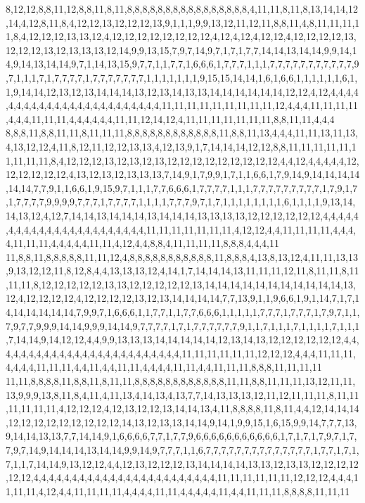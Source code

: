 8,12,12,8,8,11,12,8,8,11,8,11,8,8,8,8,8,8,8,8,8,8,8,8,8,8,8,8,4,11,11,8,11,8,13,14,14,12,14,4,12,8,11,8,4,12,12,13,12,12,12,13,9,1,1,1,9,9,13,12,11,12,11,8,8,11,4,8,11,11,11,11,8,4,12,12,12,13,13,12,4,12,12,12,12,12,12,12,12,4,12,4,12,4,12,12,4,12,12,12,12,13,12,12,12,13,12,13,13,13,12,14,9,9,13,15,7,9,7,14,9,7,1,7,1,7,7,14,14,13,14,14,9,9,14,14,9,14,13,14,14,9,7,1,14,13,15,9,7,7,1,1,7,7,1,6,6,6,1,7,7,7,1,1,1,7,7,7,7,7,7,7,7,7,7,7,9,7,1,1,1,7,1,7,7,7,7,1,7,7,7,7,7,7,7,1,1,1,1,1,1,1,9,15,15,14,14,1,6,1,6,6,1,1,1,1,1,1,6,1,1,9,14,14,12,13,12,13,14,14,14,13,12,13,14,13,13,14,14,14,14,14,14,12,12,4,12,4,4,4,4,4,4,4,4,4,4,4,4,4,4,4,4,4,4,4,4,4,4,4,4,11,11,11,11,11,11,11,11,11,12,4,4,4,11,11,11,11,4,4,4,11,11,11,4,4,4,4,4,4,11,11,12,14,12,4,11,11,11,11,11,11,11,8,8,11,11,4,4,4
8,8,8,11,8,8,11,11,8,11,11,11,8,8,8,8,8,8,8,8,8,8,8,8,11,8,8,11,13,4,4,4,11,11,13,11,13,4,13,12,12,4,11,8,12,11,12,12,13,13,4,12,13,9,1,7,14,14,14,12,12,8,8,11,11,11,11,11,11,11,11,11,8,4,12,12,12,13,12,13,12,13,12,12,12,12,12,12,12,12,12,4,4,12,4,4,4,4,4,12,12,12,12,12,12,4,13,12,13,12,13,13,13,7,14,9,1,7,9,9,1,7,1,1,6,6,1,7,9,14,9,14,14,14,14,14,14,7,7,9,1,1,6,6,1,9,15,9,7,1,1,1,7,7,6,6,6,1,7,7,7,7,1,1,1,7,7,7,7,7,7,7,7,7,1,7,9,1,7,1,7,7,7,7,9,9,9,9,7,7,7,1,7,7,7,7,1,1,1,1,7,7,7,9,7,1,7,1,1,1,1,1,1,1,1,6,1,1,1,1,9,13,14,14,13,12,4,12,7,14,14,13,14,14,14,13,14,14,14,13,13,13,13,12,12,12,12,12,12,4,4,4,4,4,4,4,4,4,4,4,4,4,4,4,4,4,4,4,4,4,4,4,11,11,11,11,11,11,11,4,12,12,4,4,11,11,11,11,4,4,4,4,11,11,11,4,4,4,4,4,11,11,4,12,4,4,8,8,4,11,11,11,11,8,8,8,4,4,4,11
11,8,8,11,8,8,8,8,8,11,11,12,4,8,8,8,8,8,8,8,8,8,8,8,11,8,8,8,4,13,8,13,12,4,11,11,13,13,9,13,12,12,11,8,12,8,4,4,13,13,13,12,4,14,1,7,14,14,14,13,11,11,11,12,11,8,11,11,8,11,11,11,8,12,12,12,12,12,13,13,12,12,12,12,12,13,14,14,14,14,14,14,14,14,14,14,14,13,12,4,12,12,12,12,4,12,12,12,12,13,12,13,14,14,14,14,7,7,13,9,1,1,9,6,6,1,9,1,14,7,1,7,14,14,14,14,14,14,7,9,9,7,1,6,6,6,1,1,7,7,1,1,7,7,6,6,6,1,1,1,1,1,7,7,7,1,7,7,7,1,7,9,7,1,1,7,9,7,7,9,9,9,14,14,9,9,9,14,14,9,7,7,7,7,1,7,1,7,7,7,7,7,7,9,1,1,7,1,1,1,7,1,1,1,1,7,1,1,1,7,14,14,9,14,12,12,4,4,9,9,13,13,13,14,14,14,14,14,12,13,14,13,12,12,12,12,12,12,4,4,4,4,4,4,4,4,4,4,4,4,4,4,4,4,4,4,4,4,4,4,4,4,4,11,11,11,11,11,11,12,12,12,4,4,4,11,11,11,4,4,4,4,11,11,11,4,4,11,4,4,11,11,4,4,4,4,11,11,4,4,11,11,11,8,8,8,11,11,11,11
11,11,8,8,8,8,11,8,8,11,8,11,11,8,8,8,8,8,8,8,8,8,8,8,8,11,11,8,8,11,11,11,13,12,11,11,13,9,9,9,13,8,11,8,4,11,4,11,13,4,14,13,4,13,7,7,14,13,13,13,12,11,12,11,11,11,8,11,11,11,11,11,11,4,12,12,12,4,12,13,12,12,13,14,14,13,4,11,8,8,8,8,11,8,11,4,4,12,14,14,14,12,12,12,12,12,12,12,12,12,14,13,12,13,13,14,14,9,14,1,9,9,15,1,6,15,9,9,14,7,7,7,13,9,14,14,13,13,7,7,14,14,9,1,6,6,6,6,7,7,1,7,7,9,6,6,6,6,6,6,6,6,6,6,6,1,7,1,7,1,7,9,7,1,7,7,9,7,14,9,14,14,14,13,14,14,9,9,14,9,7,7,7,1,1,6,7,7,7,7,7,7,7,7,7,7,7,7,7,7,1,7,7,1,7,1,7,1,1,7,14,14,9,13,12,12,4,4,12,13,12,12,12,13,14,14,14,14,13,13,12,13,13,12,12,12,12,12,12,4,4,4,4,4,4,4,4,4,4,4,4,4,4,4,4,4,4,4,4,4,4,4,4,11,11,11,11,11,11,12,12,12,4,4,4,11,11,11,4,12,4,4,11,11,11,11,4,4,4,4,11,11,4,4,4,4,4,11,4,4,11,11,11,8,8,8,8,11,11,11
